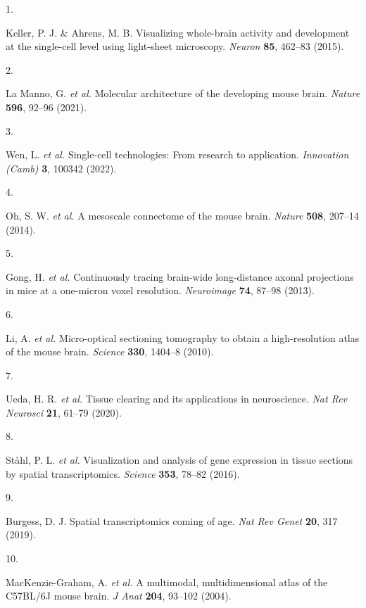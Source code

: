 \documentclass[
  12pt,
]{article}
\newlength{\cslhangindent}
\newlength{\csllabelwidth}
\newenvironment{CSLReferences}[2] %
 {%
  \setlength{\parindent}{0pt}
  \ifodd #1 \everypar{\setlength{\hangindent}{\cslhangindent}}\ignorespaces\fi
  \ifnum #2 > 0
  \setlength{\parskip}{#2\baselineskip}
  \fi
 }%
 {}
\newcommand{\CSLLeftMargin}[1]{\parbox[t]{\csllabelwidth}{#1}}
\newcommand{\CSLRightInline}[1]{\parbox[t]{\linewidth - \csllabelwidth}{#1}\break}
\begin{document}
\hypertarget{refs}{}
\begin{CSLReferences}{0}{0}
\leavevmode{}%
\CSLLeftMargin{1. }
\CSLRightInline{Keller, P. J. \& Ahrens, M. B. Visualizing whole-brain
activity and development at the single-cell level using light-sheet
microscopy. \emph{Neuron} \textbf{85}, 462--83 (2015).}

\leavevmode{}%
\CSLLeftMargin{2. }
\CSLRightInline{La Manno, G. \emph{et al.} Molecular architecture of the
developing mouse brain. \emph{Nature} \textbf{596}, 92--96 (2021).}

\leavevmode{}%
\CSLLeftMargin{3. }
\CSLRightInline{Wen, L. \emph{et al.} Single-cell technologies: From
research to application. \emph{Innovation (Camb)} \textbf{3}, 100342
(2022).}

\leavevmode{}%
\CSLLeftMargin{4. }
\CSLRightInline{Oh, S. W. \emph{et al.} A mesoscale connectome of the
mouse brain. \emph{Nature} \textbf{508}, 207--14 (2014).}

\leavevmode{}%
\CSLLeftMargin{5. }
\CSLRightInline{Gong, H. \emph{et al.} Continuously tracing brain-wide
long-distance axonal projections in mice at a one-micron voxel
resolution. \emph{Neuroimage} \textbf{74}, 87--98 (2013).}

\leavevmode{}%
\CSLLeftMargin{6. }
\CSLRightInline{Li, A. \emph{et al.} Micro-optical sectioning tomography
to obtain a high-resolution atlas of the mouse brain. \emph{Science}
\textbf{330}, 1404--8 (2010).}

\leavevmode{}%
\CSLLeftMargin{7. }
\CSLRightInline{Ueda, H. R. \emph{et al.} Tissue clearing and its
applications in neuroscience. \emph{Nat Rev Neurosci} \textbf{21},
61--79 (2020).}

\leavevmode{}%
\CSLLeftMargin{8. }
\CSLRightInline{Ståhl, P. L. \emph{et al.} Visualization and analysis of
gene expression in tissue sections by spatial transcriptomics.
\emph{Science} \textbf{353}, 78--82 (2016).}

\leavevmode{}%
\CSLLeftMargin{9. }
\CSLRightInline{Burgess, D. J. Spatial transcriptomics coming of age.
\emph{Nat Rev Genet} \textbf{20}, 317 (2019).}

\leavevmode{}%
\CSLLeftMargin{10. }
\CSLRightInline{MacKenzie-Graham, A. \emph{et al.} A multimodal,
multidimensional atlas of the C57BL/6J mouse brain. \emph{J Anat}
\textbf{204}, 93--102 (2004).}


\end{CSLReferences}
\end{document}
